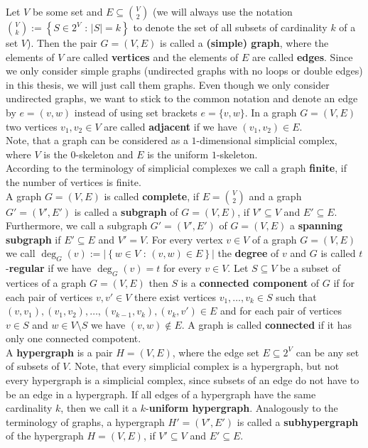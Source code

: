 Let \(V\) be some set and \(E\subseteq\binom{V}{2}\) (we will always use the notation\\
\(\binom{V}{k}:=\left\{S\in 2^V\text{ : }\left|S\right|=k\right\}\) to denote the set of all subsets of cardinality \(k\) of a set \(V\)). Then the pair \(G=\left(V,E\right)\) is called a \textbf{(simple) graph}, where the elements of \(V\) are called \textbf{vertices} and the elements of \(E\) are called \textbf{edges}. Since we only consider simple graphs (undirected graphs with no loops or double edges) in this thesis, we will just call them graphs. Even though we only consider undirected graphs, we want to stick to the common notation and denote an edge by \(e=(v,w)\) instead of using set brackets \(e=\{v,w\}\). In a graph \(G=(V,E)\) two vertices \(v_1,v_2\in V\) are called \textbf{adjacent} if we have \((v_1,v_2)\in E\).\\
Note, that a graph can be considered as a \(1\)-dimensional simplicial complex, where \(V\) is the \(0\)-skeleton and \(E\) is the uniform \(1\)-skeleton.\\
According to the terminology of simplicial complexes we call a graph \textbf{finite}, if the number of vertices is finite.\\
A graph \(G=(V,E)\) is called \textbf{complete}, if \(E=\binom{V}{2}\) and a graph \(G'=(V',E')\) is called a \textbf{subgraph} of \(G=(V,E)\), if \(V'\subseteq V\) and \(E'\subseteq E\). Furthermore, we call a subgraph \(G'=(V',E')\) of \(G=(V,E)\) a \textbf{spanning subgraph} if \(E'\subseteq E\) and \(V'=V\). For every vertex \(v\in V\) of a graph \(G=(V,E)\) we call \(\deg_G(v):=\left|\left\{w\in V\text{ : }(v,w)\in E\right\}\right|\) the \textbf{degree} of \(v\) and \(G\) is called \(t\)-\textbf{regular} if we have \(\deg_G(v)=t\) for every \(v\in V\). Let \(S\subseteq V\) be a subset of vertices of a graph \(G=(V,E)\) then \(S\) is a \textbf{connected component} of \(G\) if for each pair of vertices \(v,v'\in V\) there exist vertices \(v_1,\ldots,v_k\in S\) such that \((v,v_1),(v_1,v_2),\ldots,(v_{k-1},v_k),(v_k,v')\in E\) and for each pair of vertices \(v\in S\) and \(w\in V\setminus S\) we have \((v,w)\notin E\). A graph is called \textbf{connected} if it has only one connected compotent.\\
A \textbf{hypergraph} is a pair \(H=(V,E)\), where the edge set \(E\subseteq 2^V\) can be any set of subsets of \(V\). Note, that every simplicial complex is a hypergraph, but not every hypergraph is a simplicial complex, since subsets of an edge do not have to be an edge in a hypergraph. If all edges of a hypergraph have the same cardinality \(k\), then we call it a \(k\)-\textbf{uniform hypergraph}. Analogously to the terminology of graphs, a hypergraph \(H'=(V',E')\) is called a \textbf{subhypergraph} of the hypergraph \(H=(V,E)\), if \(V'\subseteq V\) and \(E'\subseteq E\).

